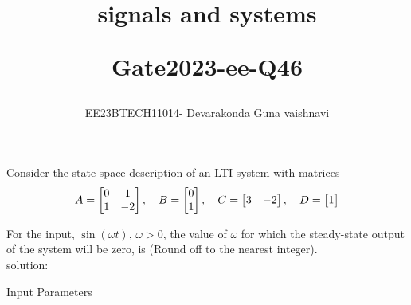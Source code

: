 \documentclass[12pt]{article}
\title{ signals and systems
\vspace{1cm}

Gate2023-ee-Q46}
\author{EE23BTECH11014- Devarakonda Guna vaishnavi}
\newcommand{\myvec}[1]{\begin{matrix} #1 \end{matrix}}
\begin{document}
\maketitle

Consider the state-space description of an LTI system with matrices
\begin{align*}
A = \begin{bmatrix} \myvec 0 & 1\\ \-1 & -2\end{bmatrix}, \quad 
B = \begin{bmatrix} \myvec0 \\ 1 \end{bmatrix}, \quad 
C = \begin{bmatrix} \myvec 3 & -2 \end{bmatrix}, \quad 
D = \begin{bmatrix} \myvec 1 \end{bmatrix}
\end{align*}

For the input, $\sin(\omega t)$, $\omega > 0$, the value of $\omega$ for which the steady-state output of the system will be zero, is \underline{\hspace{2cm}} (Round off to the nearest integer).\\
solution:
\begin{table}[h!]
    \centering
    
    \caption{Input Parameters}
    \label{table:}
\end{table}
\end{document}
